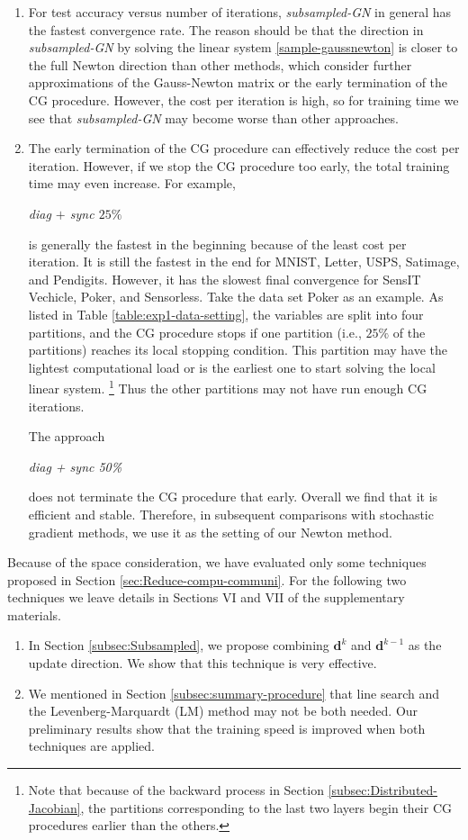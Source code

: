 \documentclass[12pt]{article}
\def\bd{{\boldsymbol d}}
\begin{document}
\begin{enumerate}[1.]
\item For test accuracy versus number of iterations, {\sl subsampled-GN} in general has the fastest convergence rate.
The reason should be that the direction in {\sl subsampled-GN} by solving the linear system \eqref{sample-gaussnewton} is closer to the full Newton direction than other methods, 
which consider further approximations of the Gauss-Newton matrix or the early termination of the CG procedure.
However, the cost per iteration is high, so for training time we see that {\sl subsampled-GN} may become worse than other approaches.
\item The early termination of the CG procedure can effectively reduce the cost per iteration. However, if we stop the CG procedure too early, the total training time may even increase. For example,
\begin{center} {\sl diag $+$ sync $25\%$} \end{center}
is generally the fastest in the beginning because of the least cost per iteration. It is still the fastest in the end for {\sf MNIST}, {\sf Letter}, {\sf USPS}, {\sf Satimage}, and {\sf Pendigits}. However, it has the slowest final convergence for {\sf SensIT Vechicle}, {\sf Poker}, and {\sf Sensorless}.
Take the data set {\sf Poker} as an example. As listed in Table \ref{table:exp1-data-setting}, the variables are split into four partitions, and the CG procedure stops if one partition (i.e., $25\%$ of the partitions) reaches its local stopping condition. This partition may have the lightest computational load or is the earliest one to start solving the local linear system.%
\footnote{Note that because of the backward process in Section \ref{subsec:Distributed-Jacobian}, the partitions corresponding to the last two layers begin their CG procedures earlier than the others.} %
Thus the other partitions may not have run enough CG iterations.
\par The approach \begin{center} {\sl diag + sync 50\%} \end{center} does not terminate the CG procedure that early. Overall we find that it is efficient and stable. Therefore, in subsequent comparisons with stochastic gradient methods, we use it as the setting of our Newton method.
\end{enumerate}
\label{cg-stop-discuss-2}
\par Because of the space consideration, we have evaluated only some techniques proposed in Section \ref{sec:Reduce-compu-communi}.
For the following two techniques we leave details in Sections VI and VII of the supplementary materials.
\begin{enumerate}[1.]
\item
In Section \ref{subsec:Subsampled}, we propose combining $\bd^k$ and $\bd^{k-1}$ as the update direction. We show that this technique is very effective.
\item
We mentioned in Section \ref{subsec:summary-procedure} that line search and the Levenberg-Marquardt (LM) method may not be both needed.
Our preliminary results show that the training speed is improved when both techniques are applied.
\end{enumerate}
\end{document}
